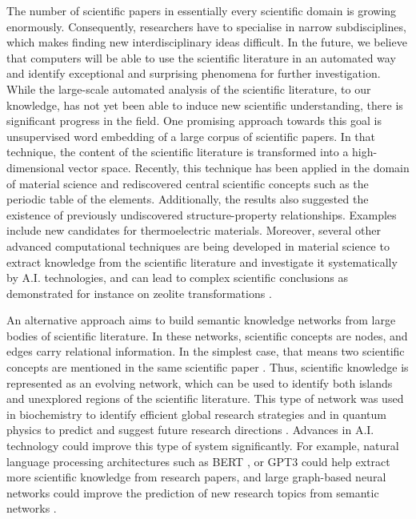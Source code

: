  The number of scientific papers in essentially every scientific domain is growing enormously\cite{larsen2010rate}. Consequently, researchers have to specialise in narrow subdisciplines, which makes finding new interdisciplinary ideas difficult. In the future, we believe that computers will be able to use the scientific literature in an automated way\cite{evans2011metaknowledge,clauset2017data,fortunato2018science,wang2021science} and identify exceptional and surprising phenomena for further investigation. While the large-scale automated analysis of the scientific literature, to our knowledge, has not yet been able to induce new scientific understanding, there is significant progress in the field. One promising approach towards this goal is unsupervised word embedding of a large corpus of scientific papers. In that technique, the content of the scientific literature is transformed into a high-dimensional vector space. Recently, this technique has been applied in the domain of material science \cite{tshitoyan2019unsupervised} and rediscovered central scientific concepts such as the periodic table of the elements. Additionally, the results also suggested the existence of previously undiscovered structure-property relationships. Examples include new candidates for thermoelectric materials. Moreover, several other advanced computational techniques are being developed in material science to extract knowledge from the scientific literature and investigate it systematically by A.I. technologies\cite{olivetti2020data}, and can lead to complex scientific conclusions as demonstrated for instance on zeolite transformations \cite{schwalbe2019graph}.

An alternative approach aims to build semantic knowledge networks from large bodies of scientific literature. In these networks, scientific concepts are nodes, and edges carry relational information. In the simplest case, that means two scientific concepts are mentioned in the same scientific paper \cite{rzhetsky2015choosing,krenn2020predicting}. Thus, scientific knowledge is represented as an evolving network, which can be used to identify both islands and unexplored regions of the scientific literature. This type of network was used in biochemistry to identify efficient global research strategies \cite{rzhetsky2015choosing} and in quantum physics to predict and suggest future research directions \cite{krenn2020predicting}. Advances in A.I. technology could improve this type of system significantly. For example, natural language processing architectures such as BERT \cite{devlin2018bert}, or GPT3 \cite{brown2020language} could help extract more scientific knowledge from research papers, and large graph-based neural networks could improve the prediction of new research topics from semantic networks \cite{hamilton2017inductive}.

